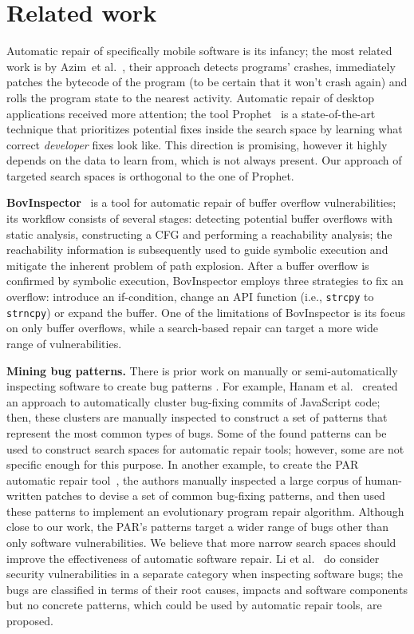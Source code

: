 \section{Related work}

Automatic repair of specifically mobile software is its infancy; the most related work is by Azim~et al.~\cite{azim2014towards}, their approach detects programs' crashes, immediately patches the bytecode of the program (to be certain that it won't crash again) and rolls the program state to the nearest activity. Automatic repair of desktop applications received more attention; the tool Prophet~\cite{long2015prophet} is a state-of-the-art technique that prioritizes potential fixes inside the search space by learning what correct \emph{developer} fixes look like. This direction is promising, however it highly depends on the data to learn from, which is not always present. Our approach of targeted search spaces is orthogonal to the one of Prophet.

\textbf{BovInspector}~\cite{bovinspector} is a tool for automatic repair of buffer overflow vulnerabilities; its workflow consists of several stages: detecting potential buffer overflows with static analysis, constructing a CFG and performing a reachability analysis; the reachability information is subsequently used to guide symbolic execution and mitigate the inherent problem of path explosion. After a buffer overflow is confirmed by symbolic execution, BovInspector employs three strategies to fix an overflow: introduce an if-condition, change an API function (i.e., \texttt{strcpy} to \texttt{strncpy}) or expand the buffer. One of the limitations of BovInspector is its focus on only buffer overflows, while a search-based repair can target a more wide range of vulnerabilities.

\textbf{Mining bug patterns.} There is prior work on manually or semi-automatically inspecting software to create bug patterns \cite{hanam2016discovering, kim2013automatic}.
For example, Hanam et al.~\cite{hanam2016discovering} created an approach to automatically cluster bug-fixing commits of JavaScript code; then, these clusters are manually inspected to construct a set of patterns that represent the most common types of bugs.
Some of the found patterns can be used to construct search spaces for automatic repair tools; however, some are not specific enough for this purpose. 
In another example, to create the PAR automatic repair tool~\cite{kim2013automatic}, the authors manually inspected a large corpus of human-written patches to devise a set of common bug-fixing patterns, and then used these patterns to implement an evolutionary program repair algorithm.
Although close to our work, the PAR's patterns target a wider range of bugs other than only software vulnerabilities.
We believe that more narrow search spaces should improve the effectiveness of automatic software repair.
Li et al.~\cite{li2006have} do consider security vulnerabilities in a separate category when inspecting software bugs; the bugs are classified in terms of their root causes, impacts and software components but no concrete patterns, which could be used by automatic repair tools, are proposed.
